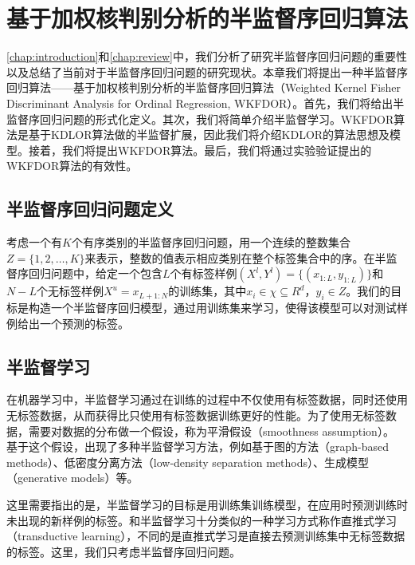 \chapter{基于加权核判别分析的半监督序回归算法}
\label{chap:wkfdor}

\autoref{chap:introduction}和\autoref{chap:review}中，我们分析了研究半监督序回归问题的重要性以及总结了当前对于半监督序回归问题的研究现状。本章我们将提出一种半监督序回归算法——基于加权核判别分析的半监督序回归算法（Weighted Kernel Fisher Discriminant Analysis for Ordinal Regression, WKFDOR）。首先，我们将给出半监督序回归问题的形式化定义。其次，我们将简单介绍半监督学习。WKFDOR算法是基于KDLOR算法\citep{sun2010kernel}做的半监督扩展，因此我们将介绍KDLOR的算法思想及模型。接着，我们将提出WKFDOR算法。最后，我们将通过实验验证提出的WKFDOR算法的有效性。

\section{半监督序回归问题定义}
考虑一个有\(K\)个有序类别的半监督序回归问题，用一个连续的整数集合 \(Z=\{1,2,\dots,K\}\)来表示，整数的值表示相应类别在整个标签集合中的序。在半监督序回归问题中，给定一个包含\(L\)个有标签样例\((X^{l},Y^{l})=\{(x_{1:L},y_{1:L})\}\)和\(N-L\)个无标签样例\(X^{u} = {x_{L+1:N}}\)的训练集，其中\(x_{i} \in \chi \subseteq R^{d}\)，\(y_{i} \in Z\)。我们的目标是构造一个半监督序回归模型，通过用训练集来学习，使得该模型可以对测试样例给出一个预测的标签。

\section{半监督学习}
在机器学习中，半监督学习通过在训练的过程中不仅使用有标签数据，同时还使用无标签数据，从而获得比只使用有标签数据训练更好的性能。为了使用无标签数据，需要对数据的分布做一个假设，称为平滑假设（smoothness assumption）\citep{chapelle2006semi}。
基于这个假设，出现了多种半监督学习方法，例如基于图的方法（graph-based methods）、低密度分离方法（low-density separation methods）、生成模型（generative models）等\citep{zhu2005semi}。

这里需要指出的是，半监督学习的目标是用训练集训练模型，在应用时预测训练时未出现的新样例的标签。和半监督学习十分类似的一种学习方式称作直推式学习（transductive learning），不同的是直推式学习是直接去预测训练集中无标签数据的标签。这里，我们只考虑半监督序回归问题。

